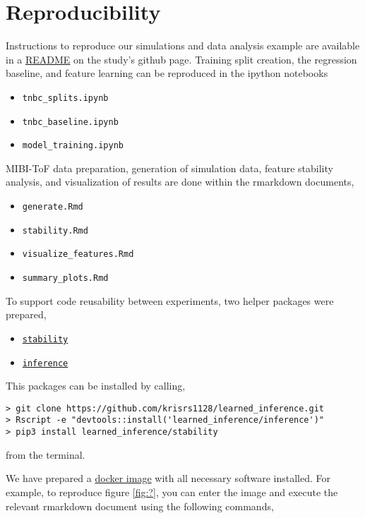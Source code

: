 
\section{Reproducibility}

Instructions to reproduce our simulations and data analysis example are
available in a \href{https://github.com/krisrs1128/learned_inference}{README} on
the study's github page. Training split creation, the regression baseline, and
feature learning can be reproduced in the ipython notebooks

\begin{itemize}
\item \texttt{tnbc\_splits.ipynb}
\item \texttt{tnbc\_baseline.ipynb}
\item \texttt{model\_training.ipynb}
\end{itemize}

MIBI-ToF data preparation, generation of simulation data, feature stability
analysis, and visualization of results are done within the rmarkdown documents,

\begin{itemize}
\item \texttt{generate.Rmd}
\item \texttt{stability.Rmd}
\item \texttt{visualize\_features.Rmd}
\item \texttt{summary\_plots.Rmd}
\end{itemize}

To support code reusability between experiments, two helper packages were prepared,

\begin{itemize}
\item \href{https://github.com/krisrs1128/learned_inference/tree/master/stability}{\texttt{stability}}
\item \href{https://github.com/krisrs1128/learned_inference/tree/master/inference}{\texttt{inference}}
\end{itemize}

This packages can be installed by calling,

\begin{verbatim}
> git clone https://github.com/krisrs1128/learned_inference.git
> Rscript -e "devtools::install('learned_inference/inference')"
> pip3 install learned_inference/stability
\end{verbatim}
from the terminal.

We have prepared a \href{https://hub.docker.com/r/krisrs1128/li}{docker image}
with all necessary software installed. For example, to reproduce figure
\ref{fig:?}, you can enter the image and execute the relevant rmarkdown document
using the following commands,

